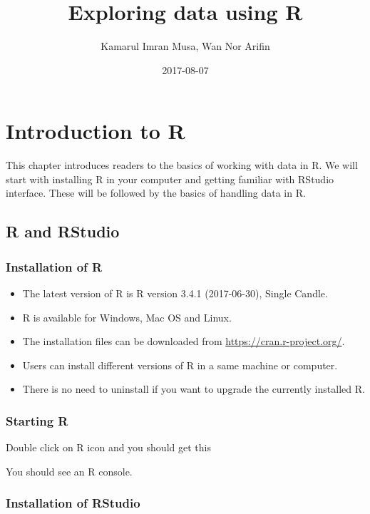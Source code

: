 \documentclass[]{book}
\title{Exploring data using R}
\author{Kamarul Imran Musa, Wan Nor Arifin}
\date{2017-08-07}
\providecommand{\tightlist}{%
  \setlength{\itemsep}{0pt}\setlength{\parskip}{0pt}}
\theoremstyle{definition}
\theoremstyle{definition}
\theoremstyle{remark}
\begin{document}
\maketitle

{
\setcounter{tocdepth}{1}
\tableofcontents
}
\chapter{Introduction to R}\label{introduction-to-r}

This chapter introduces readers to the basics of working with data in R.
We will start with installing R in your computer and getting familiar
with RStudio interface. These will be followed by the basics of handling
data in R.

\section{R and RStudio}\label{r-and-rstudio}

\subsection{Installation of R}\label{installation-of-r}

\begin{itemize}
\tightlist
\item
  The latest version of R is R version 3.4.1 (2017-06-30), Single
  Candle.
\item
  R is available for Windows, Mac OS and Linux.
\item
  The installation files can be downloaded from
  \url{https://cran.r-project.org/}.
\item
  Users can install different versions of R in a same machine or
  computer.
\item
  There is no need to uninstall if you want to upgrade the currently
  installed R.
\end{itemize}

\subsection{Starting R}\label{starting-r}

Double click on R icon and you should get this

You should see an R console.

\subsection{Installation of RStudio}\label{installation-of-rstudio}
\end{document}
